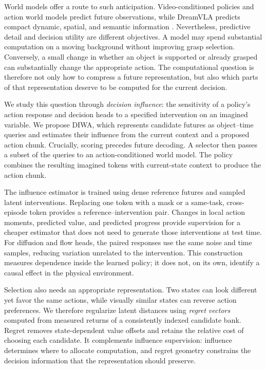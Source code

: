 \documentclass{article}
\newcommand{\method}{DIWA}
\begin{document}
World models offer a route to such anticipation. Video-conditioned policies and action world models predict future observations, while DreamVLA predicts compact dynamic, spatial, and semantic information \citep{wu2024gr1,zhou2024robodreamer,cen2025worldvla,zhang2025dreamvla}. Nevertheless, predictive detail and decision utility are different objectives. A model may spend substantial computation on a moving background without improving grasp selection. Conversely, a small change in whether an object is supported or already grasped can substantially change the appropriate action. The computational question is therefore not only how to compress a future representation, but also which parts of that representation deserve to be computed for the current decision.

We study this question through \emph{decision influence}: the sensitivity of a policy's action response and decision heads to a specified intervention on an imagined variable. We propose \method{}, which represents candidate futures as object--time queries and estimates their influence from the current context and a proposed action chunk. Crucially, scoring precedes future decoding. A selector then passes a subset of the queries to an action-conditioned world model. The policy combines the resulting imagined tokens with current-state context to produce the action chunk.

The influence estimator is trained using dense reference futures and sampled latent interventions. Replacing one token with a mask or a same-task, cross-episode token provides a reference--intervention pair. Changes in local action moments, predicted value, and predicted progress provide supervision for a cheaper estimator that does not need to generate those interventions at test time. For diffusion and flow heads, the paired responses use the same noise and time samples, reducing variation unrelated to the intervention. This construction measures dependence inside the learned policy; it does not, on its own, identify a causal effect in the physical environment.

Selection also needs an appropriate representation. Two states can look different yet favor the same actions, while visually similar states can reverse action preferences. We therefore regularize latent distances using \emph{regret vectors} computed from measured returns of a consistently indexed candidate bank. Regret removes state-dependent value offsets and retains the relative cost of choosing each candidate. It complements influence supervision: influence determines where to allocate computation, and regret geometry constrains the decision information that the representation should preserve.
\end{document}
